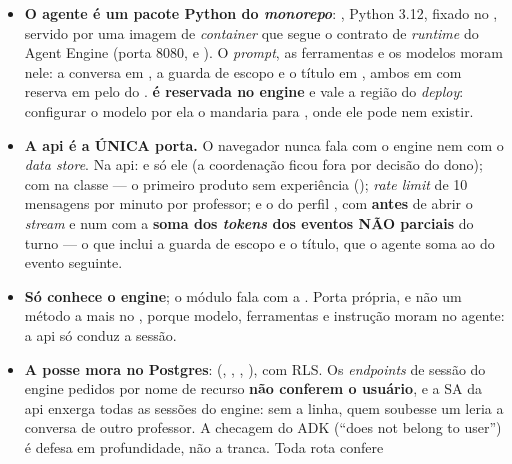 \begin{itemize}
  \item \textbf{O agente é um pacote Python do \emph{monorepo}}:
    , Python 3.12, 
    fixado no , servido por uma imagem de \emph{container} que segue o
    contrato de \emph{runtime} do Agent Engine (porta 8080,
     e ). O
    \emph{prompt}, as ferramentas e os modelos moram nele: a conversa em
    , a guarda de escopo e o título em
    , ambos em  com reserva em 
    pelo  do . \textbf{
    é reservada no engine} e vale a região do \emph{deploy}: configurar o modelo
    por ela o mandaria para , onde ele pode nem existir.
  \item \textbf{A api é a ÚNICA porta.} O navegador nunca fala com o engine nem
    com o \emph{data store}. Na api:  e só ele (a
    coordenação ficou fora por decisão do dono);  com
     na classe --- o primeiro produto sem
    experiência (); \emph{rate limit} de 10 mensagens por minuto por
    professor; e o  do perfil , com 
    \textbf{antes} de abrir o \emph{stream} e  num  com a
    \textbf{soma dos \emph{tokens} dos eventos NÃO parciais} do turno --- o que
    inclui a guarda de escopo e o título, que o agente soma ao
     do evento seguinte.
  \item \textbf{Só  conhece o engine}; o
    módulo  fala com a .
    Porta própria, e não um método a mais no , porque modelo,
    ferramentas e instrução moram no agente: a api só conduz a sessão.
  \item \textbf{A posse mora no Postgres}: 
    (, , , ), com RLS. Os
    \emph{endpoints} de sessão do engine pedidos por nome de recurso
    \textbf{não conferem o usuário}, e a SA da api enxerga todas as sessões do
    engine: sem a linha, quem soubesse um  leria a conversa de
    outro professor. A checagem do ADK (\enquote{does not belong to user}) é
    defesa em profundidade, não a tranca. Toda rota confere 

\end{itemize}
